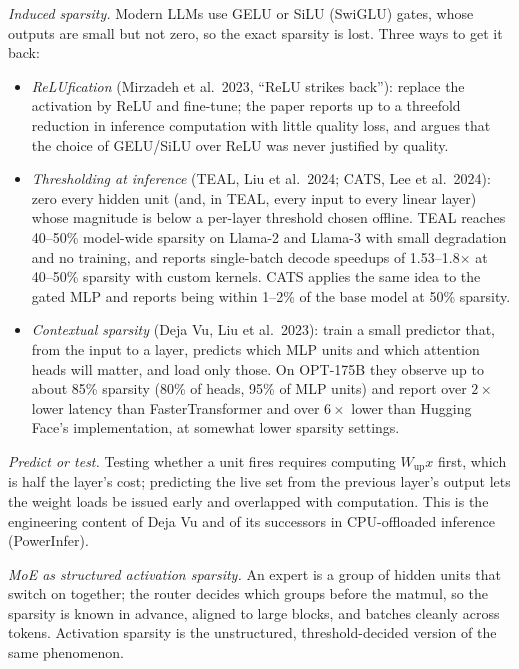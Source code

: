 \documentclass[11pt,letterpaper]{article}
\begin{document}
\emph{Induced sparsity.} Modern LLMs use GELU or SiLU (SwiGLU) gates, whose outputs are small but not zero, so the exact sparsity is lost. Three ways to get it back:
\begin{itemize}
  \item \emph{ReLUfication} (Mirzadeh et al.\ 2023, ``ReLU strikes back''): replace the activation by ReLU and fine-tune; the paper reports up to a threefold reduction in inference computation with little quality loss, and argues that the choice of GELU/SiLU over ReLU was never justified by quality.
  \item \emph{Thresholding at inference} (TEAL, Liu et al.\ 2024; CATS, Lee et al.\ 2024): zero every hidden unit (and, in TEAL, every input to every linear layer) whose magnitude is below a per-layer threshold chosen offline. TEAL reaches 40--50\% model-wide sparsity on Llama-2 and Llama-3 with small degradation and no training, and reports single-batch decode speedups of 1.53--1.8$\times$ at 40--50\% sparsity with custom kernels. CATS applies the same idea to the gated MLP and reports being within 1--2\% of the base model at 50\% sparsity.
  \item \emph{Contextual sparsity} (Deja Vu, Liu et al.\ 2023): train a small predictor that, from the input to a layer, predicts which MLP units and which attention heads will matter, and load only those. On OPT-175B they observe up to about 85\% sparsity (80\% of heads, 95\% of MLP units) and report over $2\times$ lower latency than FasterTransformer and over $6\times$ lower than Hugging Face's implementation, at somewhat lower sparsity settings.
\end{itemize}

\emph{Predict or test.} Testing whether a unit fires requires computing $W_{\text{up}}x$ first, which is half the layer's cost; predicting the live set from the previous layer's output lets the weight loads be issued early and overlapped with computation. This is the engineering content of Deja Vu and of its successors in CPU-offloaded inference (PowerInfer).

\emph{MoE as structured activation sparsity.} An expert is a group of hidden units that switch on together; the router decides which groups before the matmul, so the sparsity is known in advance, aligned to large blocks, and batches cleanly across tokens. Activation sparsity is the unstructured, threshold-decided version of the same phenomenon.
\end{document}
